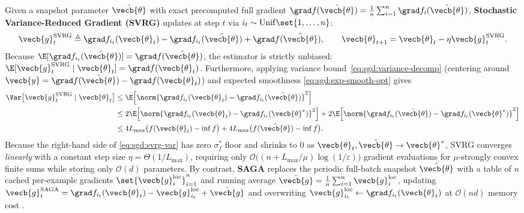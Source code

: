 \documentclass[../../../../master.tex]{subfiles}
\begin{document}
\begin{coremath}
Given a snapshot parameter $\tilde{\vecb{\theta}}$ with exact precomputed full gradient $\grad f(\tilde{\vecb{\theta}}) = \frac{1}{n}\sum_{i=1}^n \grad f_i(\tilde{\vecb{\theta}})$, \textbf{Stochastic Variance-Reduced Gradient (SVRG)}  updates at step $t$ via $i_t \sim \mathrm{Unif}\set{1,\dots,n}$:
\begin{equation}
\label{eq:sgd:svrg}
\vecb{g}_t^{\mathrm{SVRG}} \triangleq \grad f_{i_t}(\vecb{\theta}_t) - \grad f_{i_t}(\tilde{\vecb{\theta}}) + \grad f(\tilde{\vecb{\theta}}), \qquad \vecb{\theta}_{t+1} = \vecb{\theta}_t - \eta \vecb{g}_t^{\mathrm{SVRG}}.
\end{equation}
Because $\E[\grad f_{i_t}(\tilde{\vecb{\theta}})] = \grad f(\tilde{\vecb{\theta}})$, the estimator is strictly unbiased: $\E[\vecb{g}_t^{\mathrm{SVRG}} \mid \vecb{\theta}_t] = \grad f(\vecb{\theta}_t)$. Furthermore, applying variance bound~\eqref{eq:sgd:variance-decomp} (centering around $\vecb{y} = \grad f(\tilde{\vecb{\theta}}) - \grad f(\vecb{\theta}_t)$) and expected smoothness \eqref{eq:sgd:exp-smooth-opt} gives
\begin{align}
\Var\bigl[\vecb{g}_t^{\mathrm{SVRG}} \mid \vecb{\theta}_t\bigr]
&\le \E\Bigl[\norm{\grad f_{i_t}(\vecb{\theta}_t) - \grad f_{i_t}(\tilde{\vecb{\theta}})}^2\Bigr] \nonumber \\
&\le 2\E\Bigl[\norm{\grad f_{i_t}(\vecb{\theta}_t) - \grad f_{i_t}(\vecb{\theta}^*)}^2\Bigr] + 2\E\Bigl[\norm{\grad f_{i_t}(\tilde{\vecb{\theta}}) - \grad f_{i_t}(\vecb{\theta}^*)}^2\Bigr] \nonumber \\
&\le 4L_{\max}\bigl(f(\vecb{\theta}_t) - \inf f\bigr) + 4L_{\max}\bigl(f(\tilde{\vecb{\theta}}) - \inf f\bigr). \label{eq:sgd:svrg-var}
\end{align}
Because the right-hand side of \eqref{eq:sgd:svrg-var} has zero $\sigma_f^*$ floor and shrinks to $0$ as $\vecb{\theta}_t, \tilde{\vecb{\theta}} \to \vecb{\theta}^*$, SVRG converges \emph{linearly} with a constant step size $\eta = \Theta(1/L_{\max})$, requiring only $\mathcal{O}\bigl((n + L_{\max}/\mu)\log(1/\varepsilon)\bigr)$ gradient evaluations for $\mu$-strongly convex finite sums while storing only $\mathcal{O}(d)$ parameters. By contrast, \textbf{SAGA} replaces the periodic full-batch snapshot $\tilde{\vecb{\theta}}$ with a table of $n$ cached per-example gradients $\set{\vecb{g}_i^{\mathrm{loc}}}_{i=1}^n$ and running average $\bar{\vecb{g}} = \frac{1}{n}\sum_{i=1}^n \vecb{g}_i^{\mathrm{loc}}$, updating $\vecb{g}_t^{\mathrm{SAGA}} = \grad f_{i_t}(\vecb{\theta}_t) - \vecb{g}_{i_t}^{\mathrm{loc}} + \bar{\vecb{g}}$ and overwriting $\vecb{g}_{i_t}^{\mathrm{loc}} \leftarrow \grad f_{i_t}(\vecb{\theta}_t)$ at $\mathcal{O}(nd)$ memory cost .
\end{coremath}
\end{document}

